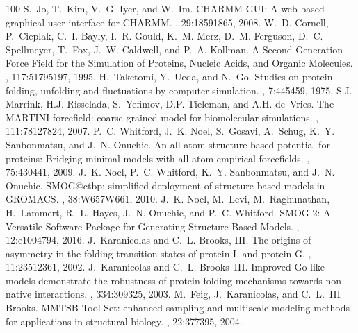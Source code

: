 \documentclass[a4paper,11pt,oneside,english]{sphinxmanual}
\begin{document}
\begin{sphinxthebibliography}{100}
S. Jo, T. Kim, V. G. Iyer, and W. Im. CHARMM GUI: A web based graphical user interface for CHARMM. , 29:1859\textendash{}1865, 2008.
W. D. Cornell, P. Cieplak, C. I. Bayly, I. R. Gould, K. M. Merz, D. M. Ferguson, D. C. Spellmeyer, T. Fox, J. W. Caldwell, and P. A. Kollman. A Second Generation Force Field for the Simulation of Proteins, Nucleic Acids, and Organic Molecules. , 117:5179\textendash{}5197, 1995.
H. Taketomi, Y. Ueda, and N. Go. Studies on protein folding, unfolding and fluctuations by computer simulation. , 7:445\textendash{}459, 1975.
S.J. Marrink, H.J. Risselada, S. Yefimov, D.P. Tieleman, and A.H. de Vries. The MARTINI forcefield: coarse grained model for biomolecular simulations. , 111:7812\textendash{}7824, 2007.
P. C. Whitford, J. K. Noel, S. Gosavi, A. Schug, K. Y. Sanbonmatsu, and J. N. Onuchic. An all-atom structure-based potential for proteins: Bridging minimal models with all-atom empirical forcefields. , 75:430\textendash{}441, 2009.
J. K. Noel, P. C. Whitford, K. Y. Sanbonmatsu, and J. N. Onuchic. SMOG@ctbp: simplified deployment of structure based models in GROMACS. , 38:W657\textendash{}W661, 2010.
J. K. Noel, M. Levi, M. Raghunathan, H. Lammert, R. L. Hayes, J. N. Onuchic, and P. C. Whitford. SMOG 2: A Versatile Software Package for Generating Structure Based Models. , 12:e1004794, 2016.
J. Karanicolas and C. L. Brooks, III. The origins of asymmetry in the folding transition states of protein L and protein G. , 11:2351\textendash{}2361, 2002.
J. Karanicolas and C. L. Brooks III. Improved Go-like models demonstrate the robustness of protein folding mechanisms towards non-native interactions. , 334:309\textendash{}325, 2003.
M. Feig, J. Karanicolas, and C. L. III Brooks. MMTSB Tool Set: enhanced sampling and multiscale modeling methods for applications in structural biology. , 22:377\textendash{}395, 2004.

\end{sphinxthebibliography}
\end{document}
